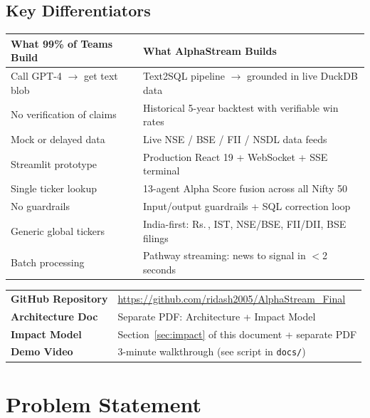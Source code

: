 \documentclass[11pt, a4paper]{article}
\newcommand{\Rs}{Rs.\,}
\begin{document}
\subsection*{Key Differentiators}

\begin{center}
\small
\begin{tabular}{L{5.2cm} L{7.8cm}}
  \toprule
  \textbf{What 99\% of Teams Build} & \textbf{What AlphaStream Builds} \\
  \midrule
  Call GPT-4 $\to$ get text blob & Text2SQL pipeline $\to$ grounded in live DuckDB data \\
  No verification of claims & Historical 5-year backtest with verifiable win rates \\
  Mock or delayed data & Live NSE / BSE / FII / NSDL data feeds \\
  Streamlit prototype & Production React 19 + WebSocket + SSE terminal \\
  Single ticker lookup & 13-agent Alpha Score fusion across all Nifty 50 \\
  No guardrails & Input/output guardrails + SQL correction loop \\
  Generic global tickers & India-first: \Rs{}, IST, NSE/BSE, FII/DII, BSE filings \\
  Batch processing & Pathway streaming: news to signal in $<$2 seconds \\
  \bottomrule
\end{tabular}
\end{center}

\begin{greenbox}[title={Submission Artefacts}]
\small
\begin{tabular}{@{}L{4cm}L{9.5cm}@{}}
  \textbf{GitHub Repository}    & \url{https://github.com/ridash2005/AlphaStream_Final} \\
  \textbf{Architecture Doc}     & Separate PDF: Architecture + Impact Model \\
  \textbf{Impact Model}         & Section~\ref{sec:impact} of this document + separate PDF \\
  \textbf{Demo Video}           & 3-minute walkthrough (see script in \texttt{docs/}) \\
\end{tabular}
\end{greenbox}

\section{Problem Statement}
\end{document}
